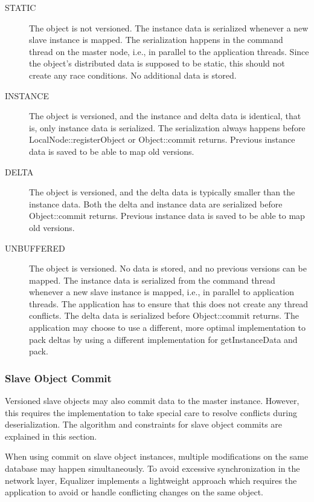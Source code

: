 \documentclass[10pt,a4]{scrartcl}
\begin{document}
\begin{description}
  \item[STATIC] The object is not versioned. The instance data is serialized
    whenever a new slave instance is mapped. The serialization happens in the
    command thread on the master node, i.e., in parallel to the application
    threads. Since the object's distributed data is supposed to be static, this
    should not create any race conditions. No additional data is stored.
  \item[INSTANCE] The object is versioned, and the instance and delta data is
    identical, that is, only instance data is serialized. The serialization
    always happens before \textsf{LocalNode::registerObject} or
    \textsf{Object::commit} returns. Previous instance data is saved to be able
    to map old versions.
  \item[DELTA] The object is versioned, and the delta data is typically smaller
    than the instance data. Both the delta and instance data are serialized
    before \textsf{Object::commit} returns. Previous instance data is saved to
    be able to map old versions.
  \item[UNBUFFERED] The object is versioned. No data is stored, and no previous
    versions can be mapped. The instance data is serialized from the command
    thread whenever a new slave instance is mapped, i.e., in parallel to
    application threads. The application has to ensure that this does not create
    any thread conflicts. The delta data is serialized before
    \textsf{Object::commit} returns. The application may choose to use a
    different, more optimal implementation to pack deltas by using a different
    implementation for \textsf{getInstanceData} and \textsf{pack}.
\end{description}


\subsubsection{\label{sSlaveCommit}Slave Object Commit}

Versioned slave objects may also commit data to the master instance. However,
this requires the implementation to take special care to resolve conflicts
during deserialization. The algorithm and constraints for slave object commits
are explained in this section.

When using \textsf{commit} on slave object instances, multiple modifications on
the same database may happen simultaneously. To avoid excessive synchronization
in the network layer, Equalizer implements a lightweight approach which requires the
application to avoid or handle conflicting changes on the same object.
\end{document}

